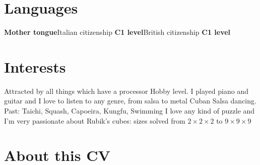 \documentclass[10pt,a4paper,sans]{moderncv}
\begin{document}
\section{Languages}
    {\textbf{Mother tongue}}{Italian citizenship}
    {\textbf{C1 level}}{British citizenship}
    {\textbf{C1 level}}{}

\section{Interests}
    {\small Attracted by all things which have a processor}
    {\small Hobby level. I played piano and guitar and I love to listen to any
    genre, from salsa to metal}
    {\small Cuban Salsa dancing. Past: Taichi, Squash, Capoeira, Kungfu,
    Swimming}
    {\small I love any kind of puzzle and I'm very passionate about Rubik's
    cubes: sizes solved from $2\times2\times2$ to $9\times9\times9$}

\nocite{*}




\section{About this CV}
%

\clearpage

\end{document}
